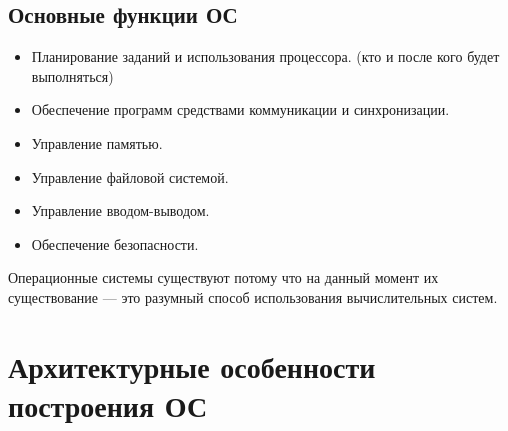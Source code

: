 \documentclass[12pt, a4paper]{article}
\begin{document}
    \subsection{Основные функции ОС}
    \begin{itemize}
        \item Планирование заданий и использования процессора. (кто и после кого будет выполняться)
        \item Обеспечение программ средствами коммуникации и синхронизации.
        \item Управление памятью.
        \item Управление файловой системой.
        \item Управление вводом-выводом.
        \item Обеспечение безопасности.
    \end{itemize}
    Операционные системы существуют потому что на данный момент их существование 
    --- это разумный способ использования вычислительных систем.
    \section{Архитектурные особенности построения ОС}
\end{document}
